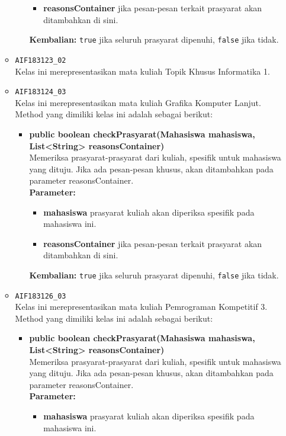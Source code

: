 \begin{enumerate}
\begin{itemize}
\begin{itemize}
\begin{itemize}
				\item \textbf{reasonsContainer} jika pesan-pesan terkait prasyarat akan ditambahkan di sini.
			\end{itemize}
			\textbf{Kembalian:} \texttt{true} jika seluruh prasyarat dipenuhi, \texttt{false} jika tidak.
		\end{itemize}
		\item \texttt{AIF183123\_02} \\
		Kelas ini merepresentasikan mata kuliah Topik Khusus Informatika 1.
		\item \texttt{AIF183124\_03} \\
		Kelas ini merepresentasikan mata kuliah Grafika Komputer Lanjut. Method yang dimiliki kelas ini adalah sebagai berikut: 
		\begin{itemize}
			\item \textbf{public boolean checkPrasyarat(Mahasiswa mahasiswa, List<String> reasonsContainer)}\\
			Memeriksa prasyarat-prasyarat dari kuliah, spesifik untuk mahasiswa yang dituju. Jika ada pesan-pesan khusus, akan ditambahkan pada parameter reasonsContainer.\\
			\textbf{Parameter:}
			\begin{itemize}
				\item \textbf{mahasiswa} prasyarat kuliah akan diperiksa spesifik pada mahasiswa ini.
				\item \textbf{reasonsContainer} jika pesan-pesan terkait prasyarat akan ditambahkan di sini.
			\end{itemize}
			\textbf{Kembalian:} \texttt{true} jika seluruh prasyarat dipenuhi, \texttt{false} jika tidak.
		\end{itemize}
		\item \texttt{AIF183126\_03} \\
		Kelas ini merepresentasikan mata kuliah Pemrograman Kompetitif 3. Method yang dimiliki kelas ini adalah sebagai berikut: 
		\begin{itemize}
			\item \textbf{public boolean checkPrasyarat(Mahasiswa mahasiswa, List<String> reasonsContainer)}\\
			Memeriksa prasyarat-prasyarat dari kuliah, spesifik untuk mahasiswa yang dituju. Jika ada pesan-pesan khusus, akan ditambahkan pada parameter reasonsContainer.\\
			\textbf{Parameter:}
			\begin{itemize}
				\item \textbf{mahasiswa} prasyarat kuliah akan diperiksa spesifik pada mahasiswa ini.

\end{itemize}
\end{itemize}
\end{itemize}
\end{enumerate}
